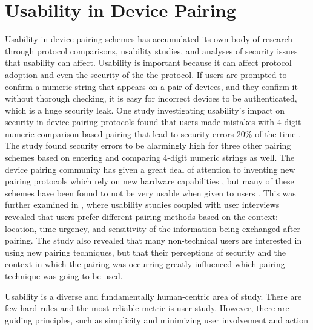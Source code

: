 \documentclass[12pt]{report}
\begin{document}
\section{Usability in Device Pairing}
Usability in device pairing schemes has accumulated its own body of research \cite{UsabilitySecurityOutOfBandPairingKainda2009,UserPerceptionPairing,PlayfulPairingGallego2011,AliceMeetsBobKumar2009,SecurePairingUsabilityUzun2007,ConferenceCompStudySecurePairingKumar2009} through protocol comparisons, usability studies, and analyses of security issues that usability can affect. Usability is important because it can affect protocol adoption and even the security of the the protocol. If users are prompted to confirm a numeric string that appears on a pair of devices, and they confirm it without thorough checking, it is easy for incorrect devices to be authenticated, which is a huge security leak. One study investigating usability's impact on security in device pairing protocols found that users made mistakes with 4-digit numeric comparison-based pairing that lead to security errors 20\% of the time \cite{SecurePairingUsabilityUzun2007}. The study found security errors to be alarmingly high for three other pairing schemes based on entering and comparing 4-digit numeric strings as well. The device pairing community has given a great deal of attention to inventing new pairing protocols which rely on new hardware capabilities \cite{PlayfulPairingGallego2011,BedaSoriente2007,ShakeWellBeforeUseMayrhofer2009,SeeingIsBelievingMcCune2005,TalkingToStrangersSmetters2002,LoudAndClearGoodrich2006,HapadepSoriente2008,VisualChannelPairingSaxena2006}, but many of these schemes have been found to not be very usable when given to users \cite{SecurePairingUsabilityUzun2007,ConferenceCompStudySecurePairingKumar2009}. This was further examined in \cite{UserPerceptionPairing}, where usability studies coupled with user interviews revealed that users prefer different pairing methods based on the context: location, time urgency, and sensitivity of the information being exchanged after pairing. The study also revealed that many non-technical users are interested in using new pairing techniques, but that their perceptions of security and the context in which the pairing was occurring greatly influenced which pairing technique was going to be used. \par

Usability is a diverse and fundamentally human-centric area of study. There are few hard rules and the most reliable metric is user-study. However, there are guiding principles, such as simplicity and minimizing user involvement and action \par
\end{document}
